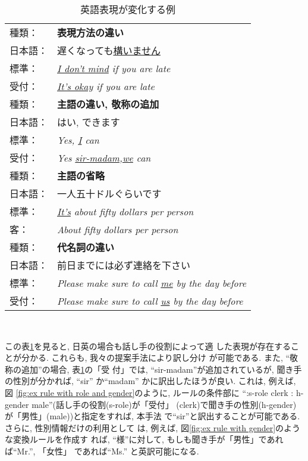 \tabcolsep=2mm
\begin{table}[htbp]
  \begin{center}
    \caption{英語表現が変化する例}
    \label{tab:ex of e-ex}
    \begin{tabular}{|ll|} \hline

      種類： & {\bf 表現方法の違い} \\
      日本語： & 遅くなっても\underline{構いません} \\
      標準： & {\it \underline{I don't mind} if you are late} \\
      受付： & {\it \underline{It's okay} if you are late} \\[1mm] \hline

      種類： & {\bf 主語の違い, 敬称の追加} \\
      日本語： & はい, できます \\
      標準： & {\it Yes, \underline{I} can} \\
      受付： & {\it Yes \underline{sir-madam},\underline{we} can}\\ \hline

      種類： & {\bf 主語の省略} \\
      日本語： & 一人五十ドルぐらいです \\
      標準： & {\it \underline{It's} about fifty dollars per person} \\
      客： & {\it About fifty dollars per person}\\ \hline

      種類： & {\bf 代名詞の違い} \\
      日本語： & 前日までには必ず連絡を下さい \\
      標準： & {\it Please make sure to call
        \underline{me} by the day before} \\
      受付： & {\it Please make sure to call
        \underline{us} by the day before} \\ \hline
    \end{tabular}\\
  \end{center}
\end{table}
\tabcolsep=0mm

この表\ref{tab:ex of e-ex}を見ると, 日英の場合も話し手の役割によって適
した表現が存在することが分かる. これらも, 我々の提案手法により訳し分け
が可能である. また, ``敬称の追加''の場合, 表\ref{tab:ex of e-ex}の「受
付」では, ``sir-madam''が追加されているが, 聞き手の性別が分かれば,
``sir'' か``madam'' かに訳出したほうが良い. これは, 例えば, 図
\ref{fig:ex rule with role and gender}のように, ルールの条件部に
``:s-role clerk : h-gender male''(話し手の役割(s-role)が「受付」
(clerk)で聞き手の性別(h-gender)が「男性」(male))と指定をすれば, 本手法
で``sir''と訳出することが可能である. さらに, 性別情報だけの利用として
は, 例えば, 図\ref{fig:ex rule with gender}のような変換ルールを作成す
れば, ``様''に対して, もしも聞き手が「男性」であれば``Mr.'', 「女性」
であれば``Ms.''  と英訳可能になる.

